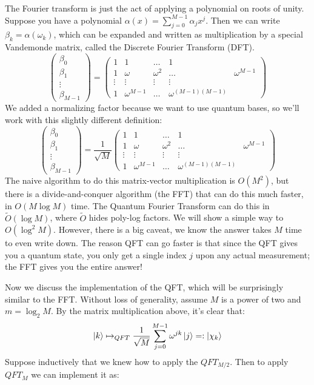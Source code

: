 The Fourier transform is just the act of applying a polynomial on roots of unity.
Suppose you have a polynomial $\alpha(x) = \sum_{j = 0}^{M - 1} \alpha_j x^j$. Then we can
write $\beta_k = \alpha(\omega_k)$, which can be expanded and written as multiplication
by a special Vandemonde matrix, called the Discrete Fourier Transform (DFT).
\[ \begin{pmatrix}
    \beta_0 \\ \beta_1 \\ \vdots \\ \beta_{M - 1}
\end{pmatrix} = \begin{pmatrix}
    1 & 1 & \dots & 1 \\
    1 & \omega & \omega^2 & \dots & \omega^{M - 1} \\
    \vdots & \vdots & \vdots & \vdots \\
    1 & \omega^{M - 1} & \dots & \omega^{(M - 1)(M - 1)}
\end{pmatrix} \]
We added a normalizing factor because we want to 
use quantum bases, so we'll work with this slightly different definition:
\[ \begin{pmatrix}
    \beta_0 \\ \beta_1 \\ \vdots \\ \beta_{M - 1}
\end{pmatrix} = \frac{1}{\sqrt{M}} \begin{pmatrix}
    1 & 1 & \dots & 1 \\
    1 & \omega & \omega^2 & \dots & \omega^{M - 1} \\
    \vdots & \vdots & \vdots & \vdots \\
    1 & \omega^{M - 1} & \dots & \omega^{(M - 1)(M - 1)}
\end{pmatrix} \]
The naive algorithm to do this matrix-vector multiplication is $O(M^2)$, but there is a
divide-and-conquer algorithm (the FFT) that can do this much faster, in $O(M \log M)$ time.
The Quantum Fourier Transform can do this in $\tilde{O}(\log M)$,
where $\tilde{O}$ hides poly-log factors. We will show a simple way to $O(\log^2 M)$. However,
there is a big caveat, we know the answer takes $M$ time to even write down.
The reason QFT can go faster is that since the QFT gives you a quantum state,
you only get a single index $j$ upon any actual measurement; the FFT gives you the entire answer!

Now we discuss the implementation of the QFT, which will be surprisingly similar to the FFT. Without loss of generality,
assume $M$ is a power of two and $m = \log_2 M$. By the matrix multiplication above, it's clear that:
\[\ket{k} \mapsto_{QFT} \frac{1}{\sqrt{M}} \sum_{j = 0}^{M - 1} \omega^{jk} \ket{j} =: \ket{\chi_k} \]
Suppose inductively that we knew how to apply the $QFT_{M/2}$. Then to apply $QFT_M$ we can implement it as:

